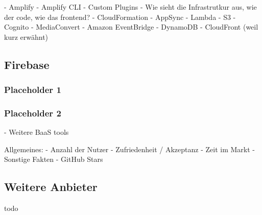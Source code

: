 \autocite{dahunsi2021commercial}
\autocite{amplifyDocs}
\autocite{lysakov2021security}
\autocite{mathew2014overview}
\autocite{beach2014aws}

  - Amplify
  - Amplify CLI
  - Custom Plugins
  - Wie sieht die Infrastrutkur aus, wie der code, wie das frontend?
  - CloudFormation
  - AppSync
  - Lambda
  - S3
  - Cognito
  - MediaConvert
  - Amazon EventBridge
  - DynamoDB
  - CloudFront (weil kurz erwähnt)

\subsection{Firebase}

\subsubsection{Placeholder 1}
\subsubsection{Placeholder 2}

\autocite{moroney2017definitive}
\autocite{firebaseDocs}
\autocite{tanna2018serverless}

- Weitere BaaS tools

Allgemeines:
  - Anzahl der Nutzer
  - Zufriedenheit / Akzeptanz
  - Zeit im Markt
  - Sonstige Fakten
  - GitHub Stars

\subsection{Weitere Anbieter}

todo